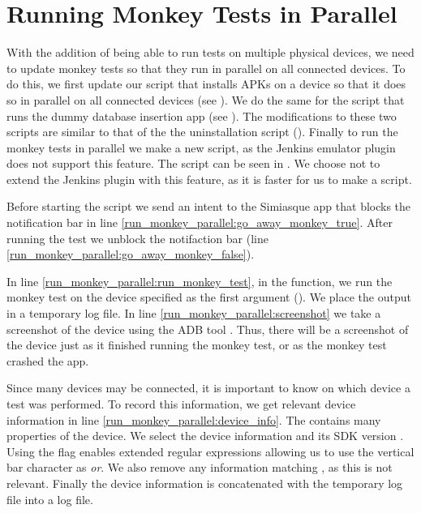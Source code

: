\section{Running Monkey Tests in Parallel}\label{sec:monkey_in_parallel}
With the addition of being able to run tests on multiple physical devices, we need to update monkey tests so that they run in parallel on all connected devices. To do this, we first update our script that installs APKs on a device so that it does so in parallel on all connected devices (see ). We do the same for the script that runs the dummy database insertion app (see ). The modifications to these two scripts are similar to that of the the uninstallation script (). Finally to run the monkey tests in parallel we make a new script, as the Jenkins emulator plugin does not support this feature. The script can be seen in . We choose not to extend the Jenkins plugin with this feature, as it is faster for us to make a script.

Before starting the script we send an intent to the Simiasque app that blocks the notification bar in line \ref{run_monkey_parallel:go_away_monkey_true}. After running the test we unblock the notifaction bar (line \ref{run_monkey_parallel:go_away_monkey_false}).

In line \ref{run_monkey_parallel:run_monkey_test}, in the  function, we run the monkey test on the device specified as the first argument (). We place the output in a temporary log file. In line \ref{run_monkey_parallel:screenshot} we take a screenshot of the device using the ADB tool \parencite{stackoverflow-adb-screencap2014}. Thus, there will be a screenshot of the device just as it finished running the monkey test, or as the monkey test crashed the app.

Since many devices may be connected, it is important to know on which device a test was performed. To record this information, we get relevant device information in line \ref{run_monkey_parallel:device_info}. The  contains many properties of the device. We select the device information and its SDK version . Using the  flag enables extended regular expressions allowing us to use the vertical bar character as \emph{or}. We also remove any information matching , as this is not relevant. Finally the device information is concatenated with the temporary log file into a log file.

